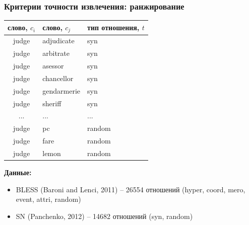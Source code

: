 \begin{frame}
\frametitle{Критерии точности извлечения: ранжирование}

{ \scriptsize

\begin{table}[h]\footnotesize
\begin{tabular}{ |c|l|l| }
\hline
\bf слово, $c_i$ & \bf  слово, $c_j$ & \bf тип отношения, $t$  \\ \hline \hline
judge & adjudicate & syn \\
judge & arbitrate & syn \\
judge & asessor & syn \\
judge & chancellor & syn \\
judge & gendarmerie & syn \\
judge & sheriff & syn \\
... & ... & ...   \\
judge & pc & random \\ 
judge & fare & random \\
judge & lemon & random \\ \hline
\end{tabular}
\end {table}

}

\textbf{Данные:}
\begin{itemize}
  \item BLESS (Baroni and Lenci, 2011)  -- 26554 отношений (hyper, coord, mero, event, attri, random)  
  \item SN (Panchenko, 2012) -- 14682  отношений (syn, random) 
\end{itemize}

\end{frame}





